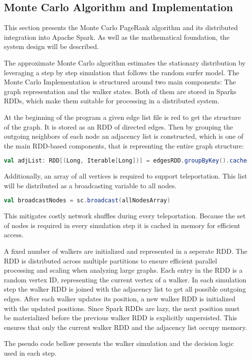 \subsection{Monte Carlo Algorithm and Implementation}
This section presents the Monte Carlo PageRank algorithm and its distributed integration into Apache Spark. As well as the mathematical foundation, the system design will be described.

The approximate Monte Carlo algorithm estimates the stationary distribution by leveraging a step by step simulation that follows the random surfer model. 
The Monte Carlo Implementation is structured around two main components: The graph representation and the walker states. Both of them are stored in Sparks RDDs, which make them suitable for processing in a distributed system. \par
At the beginning of the program a given edge list file is red to get the structure of the graph. It is stored as an RDD of directed edges. Then by grouping the outgoing neighbors of each node an adjacency list is constructed, which is one of the main RDD-based components, that is represnting the entire graph structure:
\vspace{0.5em}
\begin{lstlisting}[language=Scala, caption={Adjacency list creation}, label={lst:adjlist}]
val adjList: RDD[(Long, Iterable[Long])] = edgesRDD.groupByKey().cache()
\end{lstlisting}
\vspace{0.5em}
Additionally, an array of all vertices is required to support teleportation. This list will be distributed as a broadcasting variable to all nodes.
\vspace{0.5em}
\begin{lstlisting}[language=Scala, caption={Broadcasting Variable}, label={lst:broadcast}]
val broadcastNodes = sc.broadcast(allNodesArray)
\end{lstlisting}
\vspace{0.5em}
This mitigates costly network shuffles during every teleportation. Because the set of nodes is required in every simulation step it is cached in memory for efficient access. \par
A fixed number of walkers are initialized and represented in a seperate RDD. The RDD is distributed across multiple partitions to ensure efficient parallel processing and scaling when analyzing large graphs. Each entry in the RDD is a random vertex ID, representing the current vertex of a walker. In each simulation step the walker RDD is joined with the adjacency list to get all possible outgoing edges. After each walker updates its position, a new walker RDD is initialized with the updated positions. Since Spark RDDs are lazy, the next position must be materialized before the previous walker RDD is explicitly unpersisted. This ensures that only the current walker RDD and the adjacency list occupy memory. \par
The pseudo code bellow presents the walker simulation and the decision logic used in each step. 

